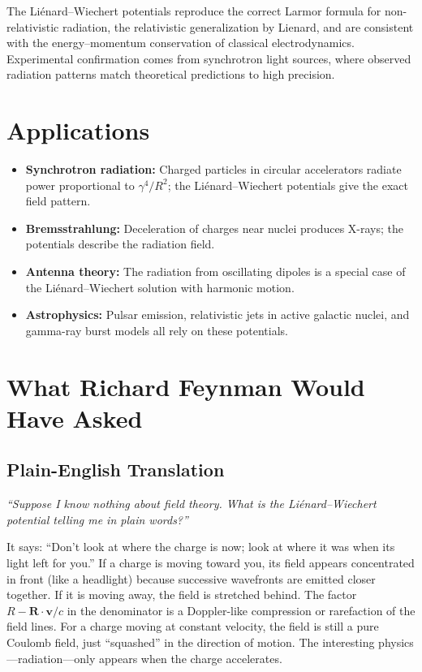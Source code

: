 The Liénard--Wiechert potentials reproduce the correct Larmor formula for non-relativistic radiation, the relativistic generalization by Lienard, and are consistent with the energy--momentum conservation of classical electrodynamics. Experimental confirmation comes from synchrotron light sources, where observed radiation patterns match theoretical predictions to high precision.
\section*{Applications}

\begin{itemize}
  \item \textbf{Synchrotron radiation:} Charged particles in circular accelerators radiate power proportional to $\gamma^{4}/R^{2}$; the Liénard--Wiechert potentials give the exact field pattern.
  \item \textbf{Bremsstrahlung:} Deceleration of charges near nuclei produces X-rays; the potentials describe the radiation field.
  \item \textbf{Antenna theory:} The radiation from oscillating dipoles is a special case of the Liénard--Wiechert solution with harmonic motion.
  \item \textbf{Astrophysics:} Pulsar emission, relativistic jets in active galactic nuclei, and gamma-ray burst models all rely on these potentials.
\end{itemize}
\section*{What Richard Feynman Would Have Asked}

\subsection*{Plain-English Translation}
\textit{``Suppose I know nothing about field theory. What is the Liénard--Wiechert potential telling me in plain words?''}

It says: ``Don't look at where the charge is now; look at where it was when its light left for you.'' If a charge is moving toward you, its field appears concentrated in front (like a headlight) because successive wavefronts are emitted closer together. If it is moving away, the field is stretched behind. The factor $R - \mathbf{R}\cdot\mathbf{v}/c$ in the denominator is a Doppler-like compression or rarefaction of the field lines. For a charge moving at constant velocity, the field is still a pure Coulomb field, just ``squashed'' in the direction of motion. The interesting physics---radiation---only appears when the charge accelerates.

